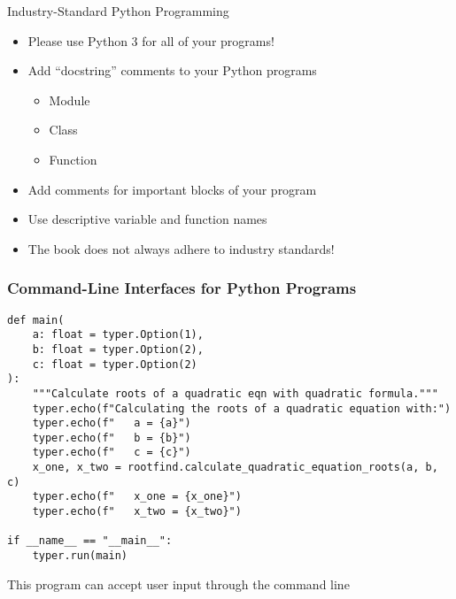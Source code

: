 \documentclass[14pt,aspectratio=169]{beamer}
\begin{document}
%
\begin{frame}{Industry-Standard Python Programming}
  \begin{itemize}
    \item Please use Python 3 for all of your programs!
      \vspace*{-.15in}
    \item Add ``docstring'' comments to your Python programs
      \begin{itemize}
        \item Module
        \item Class
        \item Function
      \end{itemize}
      \vspace*{-.2in}
    \item Add comments for important blocks of your program
      \vspace*{-.2in}
    \item Use descriptive variable and function names
      \vspace*{-.2in}
    \item The book does not always adhere to industry standards!
  \end{itemize}
\end{frame}

%
\begin{frame}[fragile]
  \frametitle{Command-Line Interfaces for Python Programs}
  \normalsize
  \hspace*{-.15in}
  \begin{minipage}{6in}
    \vspace*{.15in}
    \begin{verbatim}
def main(
    a: float = typer.Option(1),
    b: float = typer.Option(2),
    c: float = typer.Option(2)
):
    """Calculate roots of a quadratic eqn with quadratic formula."""
    typer.echo(f"Calculating the roots of a quadratic equation with:")
    typer.echo(f"   a = {a}")
    typer.echo(f"   b = {b}")
    typer.echo(f"   c = {c}")
    x_one, x_two = rootfind.calculate_quadratic_equation_roots(a, b, c)
    typer.echo(f"   x_one = {x_one}")
    typer.echo(f"   x_two = {x_two}")

if __name__ == "__main__":
    typer.run(main)
    \end{verbatim}
  \end{minipage}
  \vspace*{.05in}
  \begin{center}
    \normalsize \noindent This program can accept user input through the command line \\
  \end{center}
\end{frame}
\end{document}
